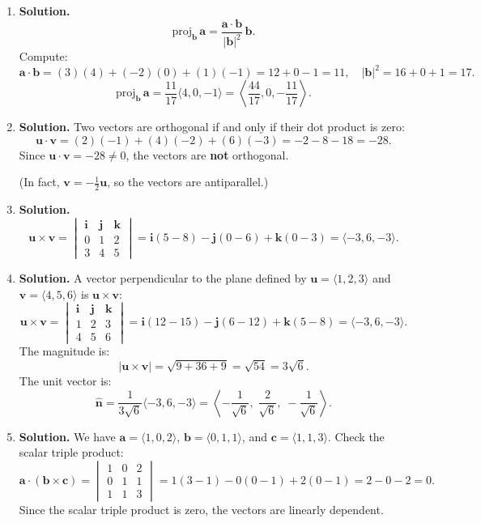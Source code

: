 \begin{enumerate}
\item \textbf{Solution.}
\[
\text{proj}_{\mathbf{b}}\,\mathbf{a} = \frac{\mathbf{a} \cdot \mathbf{b}}{|\mathbf{b}|^2}\,\mathbf{b}.
\]
Compute:
\[
\mathbf{a} \cdot \mathbf{b} = (3)(4) + (-2)(0) + (1)(-1) = 12 + 0 - 1 = 11, \quad |\mathbf{b}|^2 = 16 + 0 + 1 = 17.
\]
\[
\text{proj}_{\mathbf{b}}\,\mathbf{a} = \frac{11}{17}\langle 4, 0, -1 \rangle = \left\langle \frac{44}{17}, 0, -\frac{11}{17} \right\rangle.
\]

\item \textbf{Solution.}
Two vectors are orthogonal if and only if their dot product is zero:
\[
\mathbf{u} \cdot \mathbf{v} = (2)(-1) + (4)(-2) + (6)(-3) = -2 - 8 - 18 = -28.
\]
Since \( \mathbf{u} \cdot \mathbf{v} = -28 \neq 0 \), the vectors are \textbf{not} orthogonal.

(In fact, \( \mathbf{v} = -\frac{1}{2}\mathbf{u} \), so the vectors are antiparallel.)

\item \textbf{Solution.}
\[
\mathbf{u} \times \mathbf{v} = \begin{vmatrix} \mathbf{i} & \mathbf{j} & \mathbf{k} \\ 0 & 1 & 2 \\ 3 & 4 & 5 \end{vmatrix} = \mathbf{i}(5 - 8) - \mathbf{j}(0 - 6) + \mathbf{k}(0 - 3) = \langle -3, 6, -3 \rangle.
\]

\item \textbf{Solution.}
A vector perpendicular to the plane defined by \( \mathbf{u} = \langle 1, 2, 3 \rangle \) and \( \mathbf{v} = \langle 4, 5, 6 \rangle \) is \( \mathbf{u} \times \mathbf{v} \):
\[
\mathbf{u} \times \mathbf{v} = \begin{vmatrix} \mathbf{i} & \mathbf{j} & \mathbf{k} \\ 1 & 2 & 3 \\ 4 & 5 & 6 \end{vmatrix} = \mathbf{i}(12 - 15) - \mathbf{j}(6 - 12) + \mathbf{k}(5 - 8) = \langle -3, 6, -3 \rangle.
\]
The magnitude is:
\[
|\mathbf{u} \times \mathbf{v}| = \sqrt{9 + 36 + 9} = \sqrt{54} = 3\sqrt{6}.
\]
The unit vector is:
\[
\hat{\mathbf{n}} = \frac{1}{3\sqrt{6}}\langle -3, 6, -3 \rangle = \left\langle -\frac{1}{\sqrt{6}},\; \frac{2}{\sqrt{6}},\; -\frac{1}{\sqrt{6}} \right\rangle.
\]

\item \textbf{Solution.}
We have \( \mathbf{a} = \langle 1, 0, 2 \rangle \), \( \mathbf{b} = \langle 0, 1, 1 \rangle \), and \( \mathbf{c} = \langle 1, 1, 3 \rangle \). Check the scalar triple product:
\[
\mathbf{a} \cdot (\mathbf{b} \times \mathbf{c}) = \begin{vmatrix} 1 & 0 & 2 \\ 0 & 1 & 1 \\ 1 & 1 & 3 \end{vmatrix} = 1(3 - 1) - 0(0 - 1) + 2(0 - 1) = 2 - 0 - 2 = 0.
\]
Since the scalar triple product is zero, the vectors are linearly dependent.


\end{enumerate}
